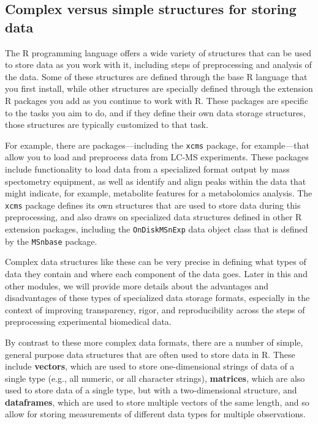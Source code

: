 \documentclass[]{tufte-book}
\begin{document}
\hypertarget{complex-versus-simple-structures-for-storing-data}{%
\subsection{Complex versus simple structures for storing data}\label{complex-versus-simple-structures-for-storing-data}}

The R programming language offers a wide variety of structures that can be
used to store data as you work with it, including steps of preprocessing
and analysis of the data. Some of these structures are defined through the
base R language that you first install, while other structures are specially
defined through the extension R packages you add as you continue to work
with R. These packages are specific to the tasks you aim to do, and if they
define their own data storage structures, those structures are typically
customized to that task.

For example, there are packages---including the \texttt{xcms} package, for
example---that allow you to load and preprocess data from LC-MS experiments.
These packages include functionality to load data from a specialized format
output by mass spectometry equipment, as well as identify and align peaks within
the data that might indicate, for example, metabolite features for a
metabolomics analysis. The \texttt{xcms} package defines its own structures that are
used to store data during this preprocessing, and also draws on specialized data
structures defined in other R extension packages, including the \texttt{OnDiskMSnExp}
data object class that is defined by the \texttt{MSnbase} package.

Complex data structures like these can be very precise in defining what types of
data they contain and where each component of the data goes. Later in this and
other modules, we will provide more details about the advantages and
disadvantages of these types of specialized data storage formats, especially in
the context of improving transparency, rigor, and reproducibility across the
steps of preprocessing experimental biomedical data.

By contrast to these more complex data formats, there are a number of simple,
general purpose data structures that are often used to store data in R. These
include \textbf{vectors}, which are used to store one-dimensional strings of data of
a single type (e.g., all numeric, or all character strings), \textbf{matrices}, which
are also used to store data of a single type, but with a two-dimensional
structure, and \textbf{dataframes}, which are used to store multiple vectors of the
same length, and so allow for storing measurements of different data types for
multiple observations.
\end{document}

